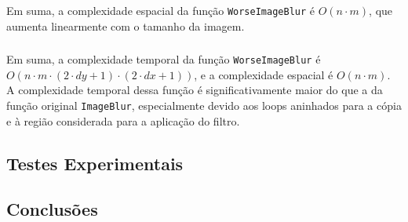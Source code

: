 \documentclass{report}
\begin{document}
\subsubsection{}
Em suma, a complexidade espacial da função \texttt{WorseImageBlur} é \(O(n \cdot m)\), que aumenta linearmente com o tamanho da imagem.

\subsubsection{}
Em suma, a complexidade temporal da função \texttt{WorseImageBlur} é \(O(n \cdot m \cdot (2 \cdot dy + 1) \cdot (2 \cdot dx + 1))\),
e a complexidade espacial é \(O(n \cdot m)\). A complexidade temporal dessa função é significativamente maior do que a da função original \texttt{ImageBlur},
especialmente devido aos loops aninhados para a cópia e à região considerada para a aplicação do filtro.


\subsection{Testes Experimentais}


\subsection{Conclusões}





\printbibliography
\end{document}
